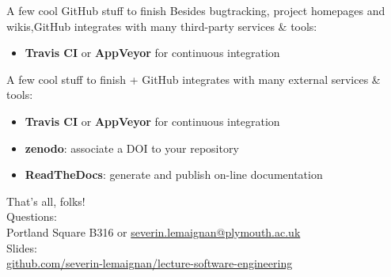 \documentclass[compress]{beamer}
\begin{document}
\begin{frame}{A few cool GitHub stuff to finish}
    Besides bugtracking, project homepages and wikis,GitHub integrates with many
    third-party services \& tools:

    \begin{itemize}
        \item {\bf Travis CI} or {\bf AppVeyor} for continuous integration
    \end{itemize}
\end{frame}


\begin{frame}{A few cool stuff to finish}
    + GitHub integrates with many external services 
    \& tools:

    \begin{itemize}
        \item {\bf Travis CI} or {\bf AppVeyor} for continuous integration
        \item {\bf zenodo}: associate a DOI to your repository
        \item {\bf ReadTheDocs}: generate and publish on-line 
            documentation
    \end{itemize}
\end{frame}




\begin{frame}{}
    \begin{center}
        \Large
        That's all, folks!\\[2em]
        \normalsize
        Questions:\\
        Portland Square B316 or \url{severin.lemaignan@plymouth.ac.uk} \\[1em]

        Slides:\\
        \href{https://github.com/severin-lemaignan/lecture-software-engineering}{\small
        github.com/severin-lemaignan/lecture-software-engineering}
        \vspace{10em}


    \end{center}
\end{frame}

\appendix

\end{document}
